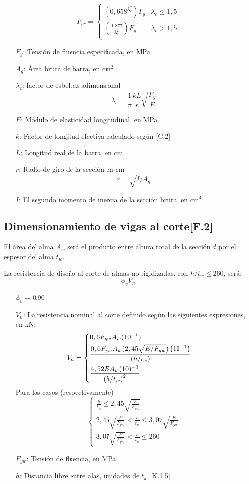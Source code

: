 \documentclass[twocolumn]{article}
\begin{document}
\[
F_{c r}=\begin{cases}
\left(0,658^{\lambda_{c}^{2}}\right) F_{y} & \lambda_c\leq 1,5 \\
\left( \frac{0,877}{\lambda_{c}^{2} } \right) F_{y} & \lambda_c > 1,5 \\
\end{cases} 
\]
\begin{itemize}
	\item[$F_y$:] Tensión de fluencia especificada, en MPa 
	\item[$A_g$:] Área bruta de barra, en cm$^2$
	\item[$\lambda_c$:] factor de esbeltez adimensional
	\[
	\lambda_{c}=\frac{1}{\pi} \frac{k L}{r} \sqrt{\frac{F_{y}}{E}}
	\] 
	\item[$E$:] Módulo de elasticidad longitudinal, en MPa
	\item[$k$:] Factor de longitud efectiva calculado según [C.2]
	\item[$L$:] Longitud real de la barra, en cm
	\item[$r$:] Radio de giro de la sección en cm
	\[
	r = \sqrt{ I/A_g }
	\]
	\item[$I$:] El segundo momento de inercia de la sección bruta, en cm$^4$
\end{itemize}

\subsection{Dimensionamiento de vigas al corte[F.2]}
El área del alma $A_w$ será el producto entre altura total de la sección $d$ por el espesor del alma $t_w$.

La resistencia de diseño al corte de almas no rigidizadas, con $h/t_w \leq 260$, será:
\[
\phi_v V_n
\]
\begin{itemize}
	\item[$\phi_v$] = 0,90
	\item[$V_n$:] La resistencia nominal al corte definido según las siguientes expresiones, en kN:
	\[
	\!\!\!\!\!\!\!\!V_n = \begin{dcases}
	\arraycolsep=1.4pt\def\arraystretch{2.2}
	0,6F_{yw} A_w (10^{-1})   \\
	\frac{0,6 F_{y w} A_{w}(2,45 \sqrt{E / F_{y w}})\left(10^{-1}\right)}{\left(h / t_{w}\right)} \\
	\frac{4,52 E A_{w}(10)^{-1}}{\left(h / t_{w}\right)^{2}}
	\end{dcases}
	\]	 
	Para los casos (respectivamente)
	\[
	\begin{cases}
	
	 \frac{h}{t_w}\leq 2,45 \sqrt{\frac{E}{F_{yw}}}\\
	 2,45\sqrt{\frac{E}{F_{yw}}}<\frac{h}{t_w}\leq 3,07 \sqrt{\frac{E}{F_{yw}}} \\
	 3,07 \sqrt{\frac{E}{F_{y w}}}<\frac{h}{t_{w}} \leq 260
	\end{cases}
	\]
	
	\item[$F_{yw}$:] Tensión de fluencia, en MPa 
	\item[$h$:] Distancia libre entre alas, unidades de $t_w$ [K.1.5]
\end{itemize}
\end{document}
